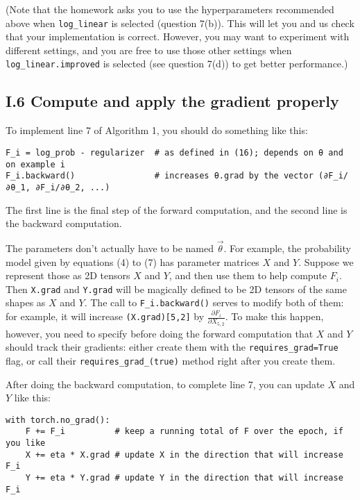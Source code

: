 (Note that the homework asks you to use the hyperparameters recommended above when \texttt{log\_linear} is selected (question 7(b)). This will let you and us check that your implementation is correct. However, you may want to experiment with different settings, and you are free to use those other settings when \texttt{log\_linear.improved} is selected (see question 7(d)) to get better performance.)

\subsection*{I.6 Compute and apply the gradient properly}

To implement line 7 of Algorithm 1, you should do something like this:
\begin{verbatim}
F_i = log_prob - regularizer  # as defined in (16); depends on θ and on example i
F_i.backward()                # increases θ.grad by the vector (∂F_i/∂θ_1, ∂F_i/∂θ_2, ...)
\end{verbatim}

The first line is the final step of the forward computation, and the second line is the backward computation.

The parameters don’t actually have to be named $\vec{\theta}$. For example, the probability model given by equations (4) to (7) has parameter matrices $X$ and $Y$. Suppose we represent those as 2D tensors $X$ and $Y$, and then use them to help compute $F_i$. Then \texttt{X.grad} and \texttt{Y.grad} will be magically defined to be 2D tensors of the same shapes as $X$ and $Y$. The call to \texttt{F\_i.backward()} serves to modify both of them: for example, it will increase \texttt{(X.grad)[5,2]} by $\frac{\partial F_i}{\partial X_{5,2}}$. To make this happen, however, you need to specify before doing the forward computation that $X$ and $Y$ should track their gradients: either create them with the \texttt{requires\_grad=True} flag, or call their \texttt{requires\_grad\_(true)} method right after you create them.

After doing the backward computation, to complete line 7, you can update $X$ and $Y$ like this:
\begin{verbatim}
with torch.no_grad():
    F += F_i          # keep a running total of F over the epoch, if you like
    X += eta * X.grad # update X in the direction that will increase F_i
    Y += eta * Y.grad # update Y in the direction that will increase F_i
\end{verbatim}

